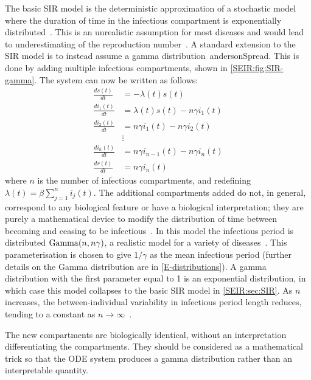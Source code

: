 \documentclass[thesis.tex]{subfiles}
\begin{document}
The basic SIR model is the deterministic approximation of a stochastic model where the duration of time in the infectious compartment is exponentially distributed~\autocite[96]{keelingModeling}.
This is an unrealistic assumption for most diseases and would lead to underestimating of the reproduction number~\autocites{lloydRealistic}{wearingAppropriate}.
A standard extension to the SIR model is to instead assume a gamma distribution~\autocite[94]{keelingModeling}{andersonSpread}.
This is done by adding multiple infectious compartments, shown in \cref{SEIR:fig:SIR-gamma}.
The system can now be written as follows:
\begin{align}
\frac{ds(t)}{dt} &= -\lambda(t) s(t)\\
\frac{di_1(t)}{dt} &= \lambda(t) s(t) - n\gamma i_1(t) \\
\frac{di_2(t)}{dt} &= n\gamma i_1(t) - n \gamma i_2(t) \\
&\vdots \nonumber \\
\frac{di_n(t)}{dt} &= n\gamma i_{n-1}(t) - n \gamma i_n(t) \\
\frac{dr(t)}{dt} &= n\gamma i_n(t)
\end{align}
where $n$ is the number of infectious compartments, and redefining $\lambda(t) = \beta \sum_{j=1}^n i_j(t)$.
The additional compartments added do not, in general, correspond to any biological feature or have a biological interpretation; they are purely a mathematical device to modify the distribution of time between becoming and ceasing to be infectious~\autocite{lloydRealistic}.
In this model the infectious period is distributed $\operatorname{Gamma}(n, n\gamma)$, a realistic model for a variety of diseases~\autocite{wearingAppropriate}.
This parameterisation is chosen to give $1/\gamma$ as the mean infectious period (further details on the Gamma distribution are in \cref{E-distributions}).
A gamma distribution with the first parameter equal to 1 is an exponential distribution, in which case this model collapses to the basic SIR model in \cref{SEIR:sec:SIR}.
As $n$ increases, the between-individual variability in infectious period length reduces, tending to a constant as $n \to \infty$~\autocite{lloydRealistic}.

The new compartments are biologically identical, without an interpretation differentiating the compartments.
They should be considered as a mathematical trick so that the ODE system produces a gamma distribution rather than an interpretable quantity.

\end{document}
